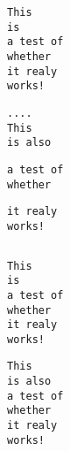 \begin{verbatim}
This
is
a test of
whether
it realy
works!
\end{verbatim}
\begin{verbatim}
....
This
is also
\end{verbatim}
\begin{verbatim}
a test of
whether
\end{verbatim}
\begin{verbatim}
it realy
works!
\end{verbatim}
\begin{verbatim}
\end{verbatim}

\begin{verbatim}
This
is
a test of
whether
it realy
works!
\end{verbatim}
\begin{verbatim}
This
is also
a test of
whether
it realy
works!
\end{verbatim}

